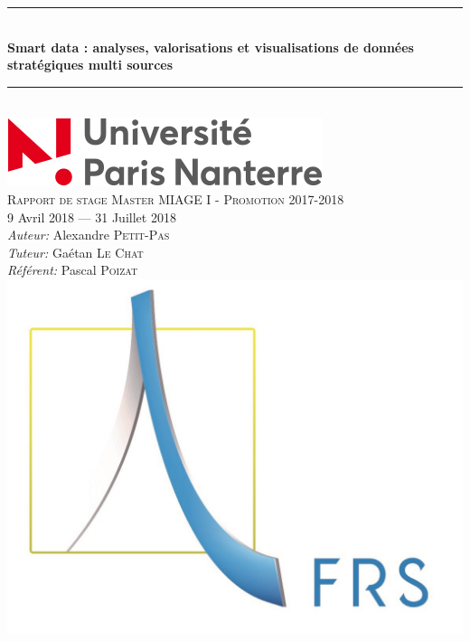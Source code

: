 \documentclass[12pt,french,a4paper, oneside,openright]{report}
\newcommand{\HRule}{\rule{\linewidth}{0.5mm}}
\begin{document}
\begin{titlepage}
  \begin{sffamily}
  \begin{center}

    \HRule \\[0.4cm]
    {
      \huge
        \textbf{Smart data : analyses, valorisations et visualisations de données stratégiques multi sources}
    }
    \HRule \\[1.5cm]
    {\includegraphics[scale=0.6, draft=false]{./resources/upn.jpg}}
    \\[1.5cm]
    \textsc{\Large Rapport de stage \linebreak Master MIAGE I - Promotion 2017-2018}\\[1.5cm]
    
    \large 9 Avril 2018 — 31 Juillet 2018
    \\[1.5cm]
	\emph{Auteur:} Alexandre \textsc{Petit-Pas}\\
	\emph{Tuteur:} Gaétan \textsc{Le Chat}\\
  	\emph{Référent:} Pascal \textsc{Poizat}\\[1cm]
	{\includegraphics[scale=0.5, draft=false]{./resources/frs.jpg}}
    
    

  \end{center}
  \end{sffamily}
\end{titlepage}
\end{document}
